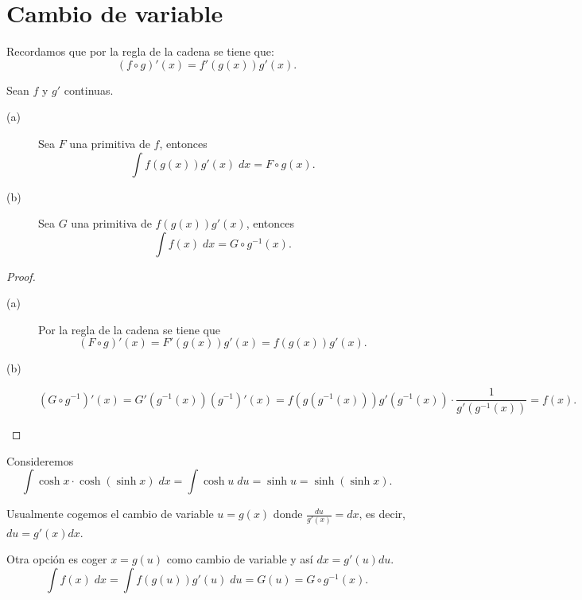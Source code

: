 \section{Cambio de variable}
Recordamos que por la regla de la cadena se tiene que:
\[\left(f\circ g\right)'\left(x\right) = f'\left(g\left(x\right)\right)g'\left(x\right) .\]
\begin{fcolorary}
\normalfont Sean $\displaystyle f $ y $\displaystyle g' $ continuas.
\begin{description}
\item[(a)] Sea $\displaystyle F $ una primitiva de $\displaystyle f $, entonces 
	\[\int f\left(g\left(x\right)\right)g'\left(x\right) \; dx = F\circ g\left(x\right) .\]
\item[(b)] Sea $\displaystyle G $ una primitiva de $\displaystyle f\left(g\left(x\right)\right)g'\left(x\right) $, entonces 
	\[\int f\left(x\right) \; dx = G\circ g^{-1}\left(x\right) .\]
\end{description}
\end{fcolorary}
\begin{proof}
\begin{description}
\item[(a)] Por la regla de la cadena se tiene que 
	\[ \left(F\circ g\right)'\left(x\right) = F'\left(g\left(x\right)\right)g'\left(x\right) = f\left(g\left(x\right)\right)g'\left(x\right) .\]
\item[(b)] 
	\[\left(G\circ g^{-1}\right)'\left(x\right) = G'\left(g^{-1}\left(x\right)\right)\left(g^{-1}\right)'\left(x\right) = f\left(g\left(g^{-1}\left(x\right)\right)\right)g'\left(g^{-1}\left(x\right)\right) \cdot \frac{1}{g'\left(g^{-1}\left(x\right)\right)}=f\left(x\right) .\]
\end{description}
\end{proof}
\begin{eg}
\normalfont Consideremos
\[\int \cosh x \cdot \cosh\left(\sinh x\right) \; dx = \int \cosh u \; du = \sinh u = \sinh\left(\sinh x\right) .\]
\end{eg}
\begin{observation}
\normalfont Usualmente cogemos el cambio de variable $\displaystyle u = g\left(x\right) $ donde $\displaystyle \frac{du}{g'\left(x\right)}=dx$, es decir, $\displaystyle du = g'\left(x\right) dx $.
\end{observation}
\begin{observation}
\normalfont Otra opción es coger $\displaystyle x = g\left(u\right) $ como cambio de variable y así $\displaystyle dx = g'\left(u\right)du $. 
\[\int f\left(x\right) \; dx = \int f\left(g\left(u\right)\right)g'\left(u\right) \; du = G\left(u\right)= G\circ g^{-1}\left(x\right) .\]
\end{observation}
